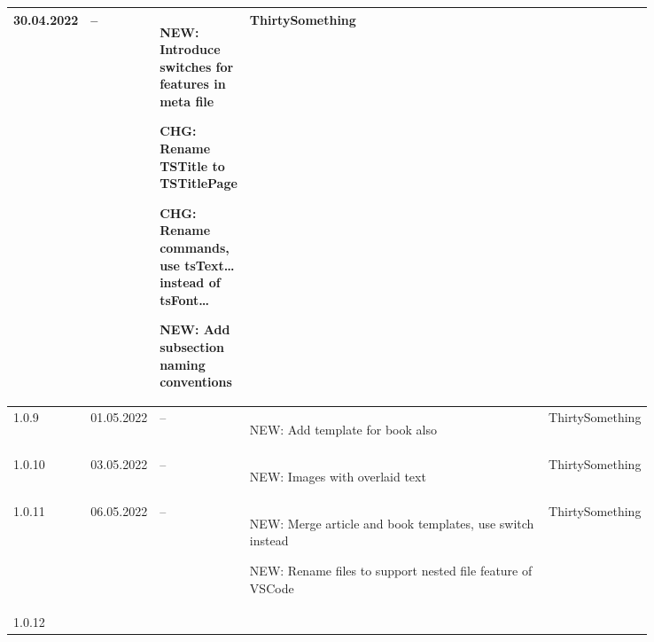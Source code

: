 \begin{tiny}
\begin{longtable}{ | p{0.06\linewidth} | p{0.08\linewidth} | p{0.06\linewidth} | p{0.49\linewidth} | p{0.15\linewidth} | }
        30.04.2022               &
        --                       &
        \begin{tsLTItemize}
            \item NEW: Introduce switches for features in meta file
            \item CHG: Rename TSTitle to TSTitlePage
            \item CHG: Rename commands, use tsText\ldots instead of tsFont\ldots
            \item NEW: Add subsection naming conventions
        \end{tsLTItemize}
                                 &
        ThirtySomething            \\
        \hline
        1.0.9                    &
        01.05.2022               &
        --                       &
        \begin{tsLTItemize}
            \item NEW: Add template for book also
        \end{tsLTItemize}
                                 &
        ThirtySomething            \\
        \hline
        1.0.10                   &
        03.05.2022               &
        --                       &
        \begin{tsLTItemize}
            \item NEW: Images with overlaid text
        \end{tsLTItemize}
                                 &
        ThirtySomething            \\
        \hline
        1.0.11                   &
        06.05.2022               &
        --                       &
        \begin{tsLTItemize}
            \item NEW: Merge article and book templates, use switch instead
            \item NEW: Rename files to support nested file feature of VSCode
        \end{tsLTItemize}
                                 &
        ThirtySomething            \\
        \hline
        1.0.12                   &

\end{longtable}
\end{tiny}

